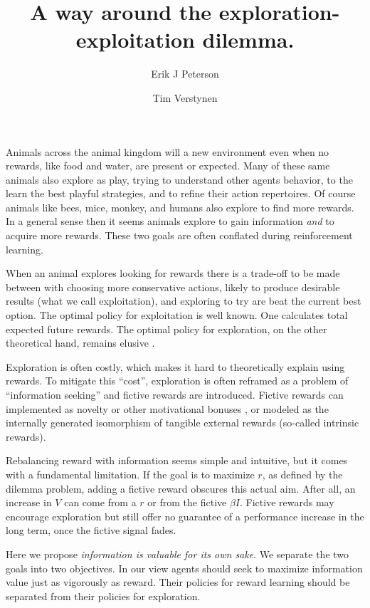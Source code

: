 \documentclass[9pt,twocolumn,twoside]{pnas-new}
\title{A way around the exploration-exploitation dilemma.}
\author[a,1]{Erik J Peterson}
\author[a,b]{Tim Verstynen}
\affil[a]{Department of Psychology}
\affil[b]{Center for the Neural Basis of Cognition, Carnegie Mellon University, Pittsburgh PA}
\begin{document}
\verticaladjustment{-2pt}
\maketitle

\thispagestyle{firststyle}
Animals across the animal kingdom will a new environment even when no rewards, like food and water, are present or expected. Many of these same animals also explore as play, trying to understand other agents behavior, to the learn the best playful strategies, and to refine their action repertoires. Of course animals like bees, mice, monkey, and humans also explore to find more rewards. In a general sense then it seems animals explore to gain information \textit{and} to acquire more rewards. These two goals are often conflated during reinforcement learning.

When an animal explores looking for rewards there is a trade-off to be made between with choosing more conservative actions, likely to produce desirable results (what we call exploitation), and exploring to try are beat the current best option. The optimal policy for exploitation is well known. One calculates total expected future rewards. The optimal policy for exploration, on the other theoretical hand, remains elusive \citep{thrun1992active, dayan1996exploration, findling2018computational, gershman2018deconstructing}. 

Exploration is often costly, which makes it hard to theoretically explain using rewards. To mitigate this ``cost'', exploration is often reframed as a problem of ``information seeking'' and fictive rewards are introduced. Fictive rewards can implemented as novelty or other motivational bonuses \citep{Sutton1990, dayan1996exploration}, or modeled as the internally generated isomorphism of tangible external rewards (so-called intrinsic rewards).  

Rebalancing reward with information seems simple and intuitive, but it comes with a fundamental limitation. If the goal is to maximize $r$, as defined by the dilemma problem, adding a fictive reward obscures this actual aim. After all, an increase in $V$ can come from a $r$ or from the fictive $\beta I$. Fictive rewards may encourage exploration but still offer no guarantee of a performance increase in the long term, once the fictive signal fades.

Here we propose \textit{information is valuable for its own sake}. We separate the two goals into two objectives. In our view agents should seek to maximize information value just as vigorously as reward. Their policies for reward learning should be separated from their policies for exploration. 
\end{document}
